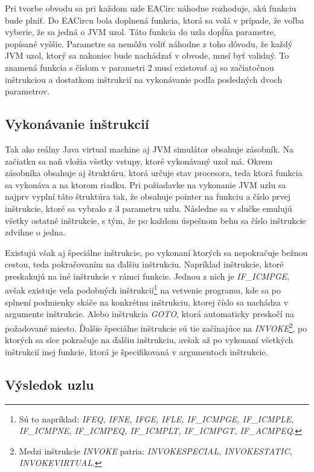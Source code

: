 Pri tvorbe obvodu sa pri každom uzle EACirc náhodne rozhoduje, akú funkciu bude plniť. Do EACircu bola doplnená funkcia, ktorá sa volá v prípade, že voľba vyberie, že sa jedná o JVM uzol. Táto funkcia do uzla dopĺňa parametre, popísané vyššie. Parametre sa nemôžu voliť náhodne z toho dôvodu, že každý JVM uzol, ktorý sa nakoniec bude nachádzať v obvode, musí byť validný. To znamená funkcia s číslom v parametri 2 musí existovať aj so začiatočnou inštrukciou a dostatkom inštrukcií na vykonávanie podľa posledných dvoch parametrov.

\subsection{Vykonávanie inštrukcií} 
\label{subsec:emulating-ins}

Tak ako reálny Java virtual machine aj JVM simulátor obsahuje zásobník. Na začiatku sa naň vložia všetky vstupy, ktoré vykonávaný uzol má. Okrem zásobníka obsahuje aj štruktúru, ktorá určuje stav procesora, teda ktorá funkcia sa vykonáva a na ktorom riadku. Pri požiadavke na vykonanie JVM uzlu sa najprv vyplní táto štruktúra tak, že obsahuje pointer na funkciu a číslo prvej inštrukcie, ktoré sa vybralo z 3 parametru uzlu. Následne sa v slučke emulujú všetky ostatné inštrukcie, s tým, že po každom úspešnom behu sa číslo inštrukcie zdvihne o jedna. 

Existujú však aj špeciálne inštrukcie, po vykonaní ktorých sa nepokračuje bežnou cestou, teda pokračovaním na ďalšiu inštrukciu. Napríklad inštrukcie, ktoré preskakujú na iné inštrukcie v rámci funkcie. Jednou z nich je \textit{IF\_ICMPGE}, avšak existuje veľa podobných inštrukcií\footnote{Sú to napríklad: \textit{IFEQ, IFNE, IFGE, IFLE, IF\_ICMPGE, IF\_ICMPLE, IF\_ICMPNE, IF\_ICMPEQ, IF\_ICMPLT, IF\_ICMPGT, IF\_ACMPEQ}.} na vetvenie programu, kde sa po splnení podmienky skáče na konkrétnu inštrukciu, ktorej číslo sa nachádza v argumente inštrukcie. Alebo inštrukcia \textit{GOTO}, ktorá automaticky preskočí na požadované miesto. Ďalšie špeciálne inštrukcie sú tie začínajúce na \textit{INVOKE}\footnote{Medzi inštrukcie \textit{INVOKE} patria: \textit{INVOKESPECIAL, INVOKESTATIC, INVOKEVIRTUAL}.}, po ktorých sa síce pokračuje na ďalšiu inštrukciu, avšak až po vykonaní všetkých inštrukcií inej funkcie, ktorá je špecifikovaná v argumentoch inštrukcie.

\subsection{Výsledok uzlu}

